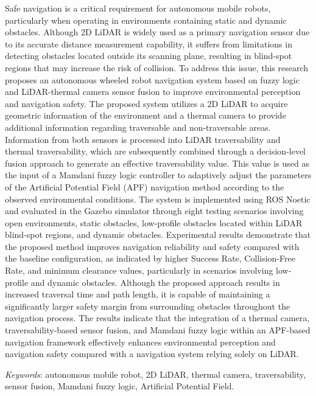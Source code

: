 Safe navigation is a critical requirement for autonomous mobile robots, particularly when operating in environments containing static and dynamic obstacles. Although 2D LiDAR is widely used as a primary navigation sensor due to its accurate distance measurement capability, it suffers from limitations in detecting obstacles located outside its scanning plane, resulting in blind-spot regions that may increase the risk of collision. To address this issue, this research proposes an autonomous wheeled robot navigation system based on fuzzy logic and LiDAR-thermal camera sensor fusion to improve environmental perception and navigation safety. The proposed system utilizes a 2D LiDAR to acquire geometric information of the environment and a thermal camera to provide additional information regarding traversable and non-traversable areas. Information from both sensors is processed into LiDAR traversability and thermal traversability, which are subsequently combined through a decision-level fusion approach to generate an effective traversability value. This value is used as the input of a Mamdani fuzzy logic controller to adaptively adjust the parameters of the Artificial Potential Field (APF) navigation method according to the observed environmental conditions. The system is implemented using ROS Noetic and evaluated in the Gazebo simulator through eight testing scenarios involving open environments, static obstacles, low-profile obstacles located within LiDAR blind-spot regions, and dynamic obstacles. Experimental results demonstrate that the proposed method improves navigation reliability and safety compared with the baseline configuration, as indicated by higher Success Rate, Collision-Free Rate, and minimum clearance values, particularly in scenarios involving low-profile and dynamic obstacles. Although the proposed approach results in increased traversal time and path length, it is capable of maintaining a significantly larger safety margin from surrounding obstacles throughout the navigation process. The results indicate that the integration of a thermal camera, traversability-based sensor fusion, and Mamdani fuzzy logic within an APF-based navigation framework effectively enhances environmental perception and navigation safety compared with a navigation system relying solely on LiDAR.

\emph{Keywords}: autonomous mobile robot, 2D LiDAR, thermal camera, traversability, sensor fusion, Mamdani fuzzy logic, Artificial Potential Field.


